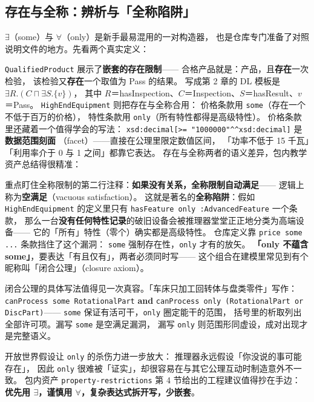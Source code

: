 \subsection{存在与全称：辨析与「全称陷阱」}

\(\exists\)（some）与 \(\forall\)（only）是新手最易混用的一对构造器，
也是仓库专门准备了对照说明文件的地方。先看两个真实定义：



\texttt{QualifiedProduct} 展示了\textbf{嵌套的存在限制}——
合格产品就是：产品，且\textbf{存在}一次检验，
该检验又\textbf{存在}一个取值为 Pass 的结果。
写成第 2 章的 DL 模板是 \(\exists R.(C \sqcap \exists S.\{v\})\)，
其中 \(R\)＝hasInspection、\(C\)＝Inspection、\(S\)＝hasResult、\(v\)＝Pass。
\texttt{HighEndEquipment} 则把存在与全称合用：
价格条款用 \texttt{some}（存在一个不低于百万的价格），
特性条款用 \texttt{only}（所有特性都得是高级特性）。
价格条款里还藏着一个值得学会的写法：
\texttt{xsd:decimal[>= "1000000"\^{}\^{}xsd:decimal]} 是\textbf{数据范围刻面}
（facet）——直接在公理里限定数值区间，
「功率不低于 15 千瓦」「利用率介于 0 与 1 之间」都靠它表达。
存在与全称两者的语义差异，包内教学资产总结得很精准：



重点盯住全称限制的第二行注释：\textbf{如果没有关系，全称限制自动满足}——
逻辑上称为\textbf{空满足}（vacuous satisfaction）。
这就是著名的\textbf{全称陷阱}：假如 \texttt{HighEndEquipment}
的定义里只有 \texttt{hasFeature only :AdvancedFeature} 一个条款，
那么一台\textbf{没有任何特性记录}的破旧设备会被推理器堂堂正正地分类为高端设备——
它的「所有」特性（零个）确实都是高级特性。
仓库定义靠 \texttt{price some ...} 条款挡住了这个漏洞：
\texttt{some} 强制存在性，\texttt{only} 才有的放矢。
\textbf{「only 不蕴含 some」}，要表达「有且仅有」，两者必须同时写——
这个组合在建模里常见到有个昵称叫「闭合公理」（closure axiom）。

闭合公理的具体写法值得见一次真容。「车床只加工回转体与盘类零件」写作：
\texttt{canProcess some RotationalPart} \textbf{and}
\texttt{canProcess only (RotationalPart or DiscPart)}——
\texttt{some} 保证有活可干，\texttt{only} 圈定能干的范围，
括号里的析取列出全部许可项。漏写 \texttt{some} 是空满足漏洞，
漏写 \texttt{only} 则范围形同虚设，成对出现才是完整语义。

开放世界假设让 \texttt{only} 的杀伤力进一步放大：
推理器永远假设「你没说的事可能存在」，
因此 \texttt{only} 很难被「证实」，却很容易在与其它公理互动时制造意外不一致。
包内资产 \texttt{property-restrictions} 第 4 节给出的工程建议值得抄在手边：
\textbf{优先用 \(\exists\)，谨慎用 \(\forall\)，复杂表达式拆开写，少嵌套}。

